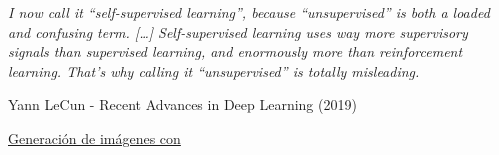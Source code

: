 \begin{frame}

{\Large\it I now call it ``self-supervised learning'', because ``unsupervised'' is both a loaded and confusing term. [\ldots] Self-supervised learning uses way more supervisory signals than supervised learning, and enormously more than reinforcement learning. That's why calling it ``unsupervised'' is totally misleading.}

\begin{flushright}
Yann LeCun - Recent Advances in Deep Learning (2019) \cite{lecun2019facebook}
\end{flushright}
\end{frame}

\begin{exercise}
\href{https://colab.research.google.com/drive/11KvEtZmi33OrZVFO9uP9d68-nQrwfO-9}{Generación de imágenes con }
\end{exercise}


